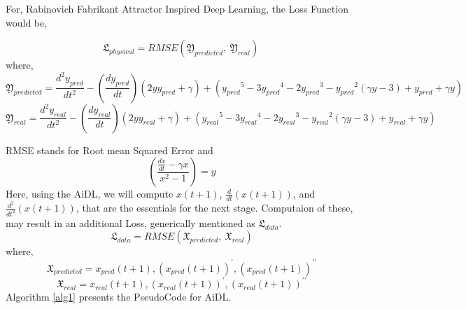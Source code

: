 \documentclass[conference]{IEEEtran}
\begin{document}
For, Rabinovich Fabrikant Attractor Inspired Deep Learning, the Loss Function would be, 
\begin{strip}
\begin{equation}\label{eq14}
\mathfrak{L}_{physical}=RMSE\left(\mathfrak{Y}_{predicted},\ \mathfrak{Y}_{real}\right)\ 
\end{equation}
where, 
\begin{equation*}
\mathfrak{Y}_{predicted}=\frac{d^2y_{pred}}{dt^2}-\left(\frac{dy_{pred}}{dt}\right)\left(2yy_{pred}+\gamma\right)+\left({y_{pred}}^5-3{y_{pred}}^4-2{y_{pred}}^3-{y_{pred}}^2\left(\gamma y-3\right)+y_{pred}+\gamma y\right)
\end{equation*}
\begin{equation*}
\mathfrak{Y}_{real}=\frac{d^2y_{real}}{dt^2}-\left(\frac{dy_{real}}{dt}\right)\left(2yy_{real}+\gamma\right)+\left({y_{real}}^5-3{y_{real}}^4-2{y_{real}}^3-{y_{real}}^2\left(\gamma y-3\right)+y_{real}+\gamma y\right)
\end{equation*}
\end{strip}
RMSE stands for Root mean Squared Error and
\begin{equation}\label{eq15}
\left(\frac{\frac{dx}{dt}-\gamma x}{x^2-1}\right)=y
\end{equation}
Here, using the AiDL, we will compute $x\left(t+1\right)$, $\frac{d}{dt}\left(x\left(t+1\right)\right)$, and $\frac{d^2}{dt^2}\left(x\left(t+1\right)\right)$, that are the essentials for the next stage. Computaion of these, may result in an additional Loss, generically mentioned as $\mathfrak{L}_{data}$.
\begin{equation}\label{eq16}
\mathfrak{L}_{data}=RMSE\left(\mathfrak{X}_{predicted},\ \mathfrak{X}_{real}\right)
\end{equation}
where,
\begin{equation*}
\mathfrak{X}_{predicted}=x_{pred}\left(t+1\right),\left(x_{pred}\left(t+1\right)\right)^\prime,\left(x_{pred}\left(t+1\right)\right)^{\prime\prime}
\end{equation*}
\begin{equation*}
\mathfrak{X}_{real}=x_{real}\left(t+1\right),\left(x_{real}\left(t+1\right)\right)^\prime,\left(x_{real}\left(t+1\right)\right)^{\prime\prime}
\end{equation*}
Algorithm \ref{alg1} presents the PseudoCode for AiDL. 
\end{document}

